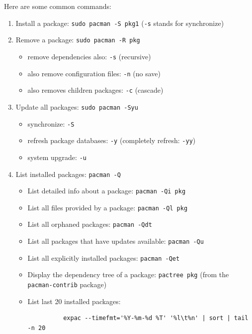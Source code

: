 \documentclass{article}
\begin{document}
    Here are some common commands: 
    \begin{enumerate}
      \item Install a package: \texttt{sudo pacman -S pkg1} (\texttt{-s} stands for synchronize)

      \item Remove a package: \texttt{sudo pacman -R pkg}
      \begin{itemize}
        \item remove dependencies also: \texttt{-s} (recursive)
        \item also remove configuration files: \texttt{-n} (no save)
        \item also removes children packages: \texttt{-c} (cascade)
      \end{itemize}

      \item Update all packages: \texttt{sudo pacman -Syu}
      \begin{itemize}
        \item synchronize: \texttt{-S}
        \item refresh package databases: \texttt{-y} (completely refresh: \texttt{-yy})
        \item system upgrade: \texttt{-u}
      \end{itemize}

      \item List installed packages: \texttt{pacman -Q}
      \begin{itemize}
        \item List detailed info about a package: \texttt{pacman -Qi pkg}
        \item List all files provided by a package: \texttt{pacman -Ql pkg}
        \item List all orphaned packages: \texttt{pacman -Qdt}
        \item List all packages that have updates available: \texttt{pacman -Qu}
        \item List all explicitly installed packages: \texttt{pacman -Qet}
        \item Display the dependency tree of a package: \texttt{pactree pkg} (from the \texttt{pacman-contrib} package) 
        \item List last 20 installed packages: 
        \begin{lstlisting}
          expac --timefmt='%Y-%m-%d %T' '%l\t%n' | sort | tail -n 20
        \end{lstlisting}
      \end{itemize}


\end{enumerate}
\end{document}
